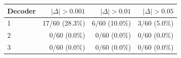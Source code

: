 \begin{tabular}{lrrr}
\toprule
Decoder & $|\Delta|>0.001$ & $|\Delta|>0.01$ & $|\Delta|>0.05$ \\
\midrule
1 & 17/60 (28.3\%) & 6/60 (10.0\%) & 3/60 (5.0\%) \\
2 & 0/60 (0.0\%) & 0/60 (0.0\%) & 0/60 (0.0\%) \\
3 & 0/60 (0.0\%) & 0/60 (0.0\%) & 0/60 (0.0\%) \\
\bottomrule
\end{tabular}
